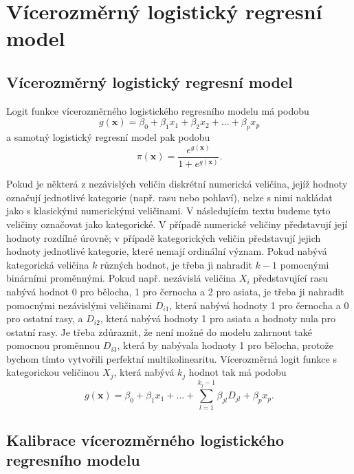 \chapter{Vícerozměrný logistický regresní model}

\section{Vícerozměrný logistický regresní model}

Logit funkce vícerozměrného logistického regresního modelu má podobu
\begin{equation}
g(\pmb{x}) = \beta_0 + \beta_1 x_1 + \beta_2 x_2 + ... + \beta_p x_p
\end{equation}
a samotný logistický regresní model pak podobu
\begin{equation}
\pi(\pmb{x}) = \frac{e^{g(\pmb{x})}}{1 + e^{g(\pmb{x})}}.
\end{equation}

Pokud je některá z nezávislých veličin diskrétní numerická veličina, jejíž hodnoty označují jednotlivé kategorie (např. rasu nebo pohlaví), nelze s nimi nakládat jako s klasickými numerickými veličinami. V následujícím textu budeme tyto veličiny označovat jako kategorické. V případě numerické veličiny představují její hodnoty rozdílné úrovně; v případě kategorických veličin představují jejich hodnoty jednotlivé kategorie, které nemají ordinální význam. Pokud nabývá kategorická veličina $k$ různých hodnot, je třeba ji nahradit $k-1$ pomocnými binárními proměnnými. Pokud např. nezávislá veličina $X_i$ představující rasu nabývá hodnot 0 pro bělocha, 1 pro černocha a 2 pro asiata, je třeba ji nahradit pomocnými nezávislými veličinami $D_{i1}$, která nabývá hodnoty 1 pro černocha a 0 pro ostatní rasy, a $D_{i2}$, která nabývá hodnoty 1 pro asiata a hodnoty nula pro ostatní rasy. Je třeba zdůraznit, že není možné do modelu zahrnout také pomocnou proměnnou $D_{i3}$, která by nabývala hodnoty 1 pro bělocha, protože bychom tímto vytvořili perfektní multikolinearitu. Vícerozměrná logit funkce s kategorickou veličinou $X_j$, která nabývá $k_j$ hodnot tak má podobu
\begin{equation}
g(\pmb{x}) = \beta_0 + \beta_1 x_1 + ... + \sum_{l = 1}^{k_j - 1} \beta_{jl}D_{jl} + \beta_p x_p.
\end{equation}

\section{Kalibrace vícerozměrného logistického regresního modelu}

